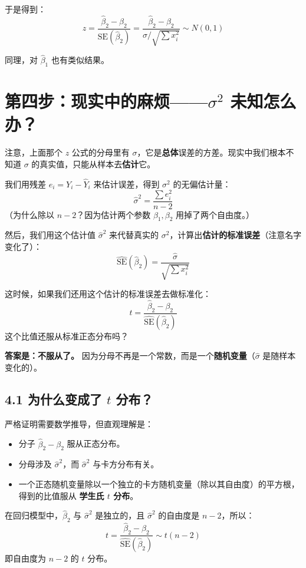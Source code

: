 \documentclass[12pt,a4paper]{ctexart}
\begin{document}
于是得到：
\[
z = \frac{\hat{\beta}_2 - \beta_2}{\text{SE}(\hat{\beta}_2)} = \frac{\hat{\beta}_2 - \beta_2}{\sigma / \sqrt{\sum x_i^2}} \sim N(0,1)
\]

同理，对 \(\hat{\beta}_1\) 也有类似结果。

\section*{第四步：现实中的麻烦——\(\sigma^2\) 未知怎么办？}

注意，上面那个 \(z\) 公式的分母里有 \(\sigma\)，它是\textbf{总体}误差的方差。现实中我们根本不知道 \(\sigma\) 的真实值，只能从样本去\textbf{估计}它。

我们用残差 \(e_i = Y_i - \hat{Y}_i\) 来估计误差，得到 \(\sigma^2\) 的无偏估计量：
\[
\hat{\sigma}^2 = \frac{\sum e_i^2}{n-2}
\]
（为什么除以 \(n-2\)？因为估计两个参数 \(\beta_1,\beta_2\) 用掉了两个自由度。）

然后，我们用这个估计值 \(\hat{\sigma}^2\) 来代替真实的 \(\sigma^2\)，计算出\textbf{估计的标准误差}（注意名字变化了）：
\[
\widehat{\text{SE}}(\hat{\beta}_2) = \frac{\hat{\sigma}}{\sqrt{\sum x_i^2}}
\]

这时候，如果我们还用这个估计的标准误差去做标准化：
\[
t = \frac{\hat{\beta}_2 - \beta_2}{\widehat{\text{SE}}(\hat{\beta}_2)}
\]
这个比值还服从标准正态分布吗？

\textbf{答案是：不服从了。} 因为分母不再是一个常数，而是一个\textbf{随机变量}（\(\hat{\sigma}\) 是随样本变化的）。

\subsection*{4.1 为什么变成了 \(t\) 分布？}
严格证明需要数学推导，但直观理解是：
\begin{itemize}
    \item 分子 \(\hat{\beta}_2 - \beta_2\) 服从正态分布。
    \item 分母涉及 \(\hat{\sigma}^2\)，而 \(\hat{\sigma}^2\) 与卡方分布有关。
    \item 一个正态随机变量除以一个独立的卡方随机变量（除以其自由度）的平方根，得到的比值服从 \textbf{学生氏 \(t\) 分布}。
\end{itemize}

在回归模型中，\(\hat{\beta}_2\) 与 \(\hat{\sigma}^2\) 是独立的，且 \(\hat{\sigma}^2\) 的自由度是 \(n-2\)，所以：
\[
t = \frac{\hat{\beta}_2 - \beta_2}{\widehat{\text{SE}}(\hat{\beta}_2)} \sim t(n-2)
\]
即自由度为 \(n-2\) 的 \(t\) 分布。
\end{document}
